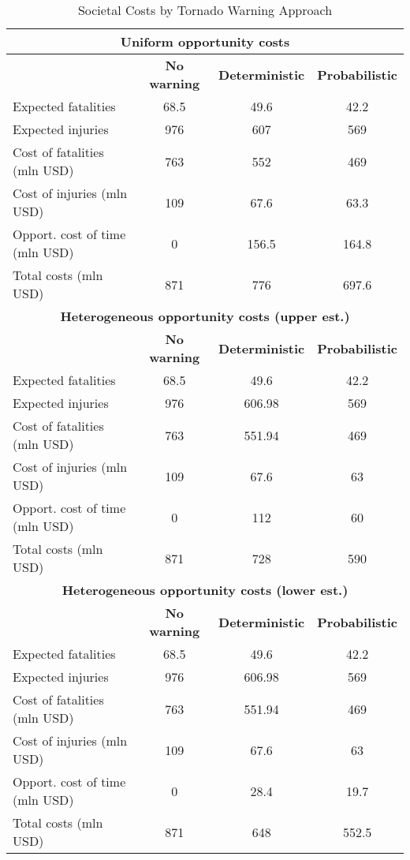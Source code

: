 
\begin{table}[!htbp]
\caption{Societal Costs by Tornado Warning Approach}
\label{dirbenefits}
\centering
\begin{tabular}{lccc}
\hline
\multicolumn{4}{c}{\textbf{Uniform opportunity costs}} \\
\hline 
 & \textbf{No warning} & \textbf{Deterministic} & \textbf{Probabilistic}\\

\hline 
Expected fatalities & 68.5 & 49.6 & 42.2  \\ 
Expected injuries   & 976 & 607  &569  \\ 
Cost of fatalities (mln USD)  & 763 & 552 & 469 \\
Cost of injuries  (mln USD)  & 109 & 67.6 & 63.3 \\
Opport. cost of time  (mln USD)  & 0 & 156.5 & 164.8  \\
Total costs (mln USD)  & 871 & 776  & 697.6 \\
\hline
\multicolumn{4}{c}{\textbf{Heterogeneous opportunity costs (upper est.)}} \\
\hline 
 & \textbf{No warning} & \textbf{Deterministic} & \textbf{Probabilistic} \\
\hline
Expected fatalities & 68.5  & 49.6 & 42.2 \\ 
Expected injuries   & 976  & 606.98 & 569  \\ 
Cost of fatalities (mln USD)  & 763  & 551.94 & 469\\
Cost of injuries  (mln USD)  & 109  & 67.6 & 63\\
Opport. cost of time  (mln USD)  & 0   & 112 & 60 \\
Total costs (mln USD)  & 871  & 728 & 590 \\
\hline
\multicolumn{4}{c}{\textbf{Heterogeneous opportunity costs (lower est.)}} \\
\hline 
 & \textbf{No warning} & \textbf{Deterministic} & \textbf{Probabilistic} \\
\hline
Expected fatalities & 68.5  & 49.6 & 42.2 \\ 
Expected injuries   & 976  & 606.98 & 569  \\ 
Cost of fatalities (mln USD)  & 763  & 551.94 & 469\\
Cost of injuries  (mln USD)  & 109  & 67.6 & 63\\
Opport. cost of time  (mln USD)  & 0   & 28.4 & 19.7 \\
Total costs (mln USD)  & 871  & 648 & 552.5 \\
\hline
\end{tabular}
\end{table}